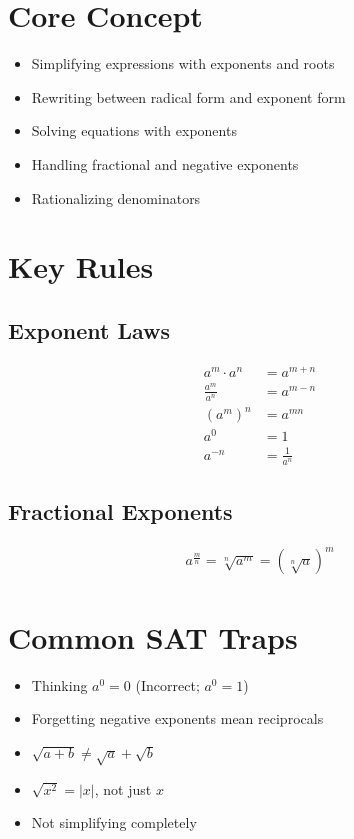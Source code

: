 
\section*{Core Concept}
\begin{itemize}
    \item Simplifying expressions with exponents and roots
    \item Rewriting between radical form and exponent form
    \item Solving equations with exponents
    \item Handling fractional and negative exponents
    \item Rationalizing denominators
\end{itemize}

\section*{Key Rules}

\subsection*{Exponent Laws}
\begin{align*}
a^m \cdot a^n &= a^{m+n} \\
\frac{a^m}{a^n} &= a^{m-n} \\
(a^m)^n &= a^{mn} \\
a^0 &= 1 \\
a^{-n} &= \frac{1}{a^n}
\end{align*}

\subsection*{Fractional Exponents}
\begin{align*}
a^{\frac{m}{n}} = \sqrt[n]{a^m} = \left(\sqrt[n]{a}\right)^m
\end{align*}

\section*{Common SAT Traps}
\begin{itemize}
    \item Thinking $a^0 = 0$ (Incorrect; $a^0 = 1$)
    \item Forgetting negative exponents mean reciprocals
    \item $\sqrt{a + b} \ne \sqrt{a} + \sqrt{b}$
    \item $\sqrt{x^2} = |x|$, not just $x$
    \item Not simplifying completely
\end{itemize}

